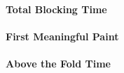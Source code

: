 






\paragraph{Total Blocking Time}









\paragraph{First Meaningful Paint}















\paragraph{Above the Fold Time}





